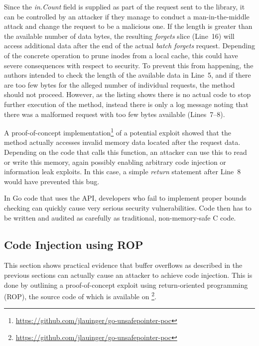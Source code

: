 Since the \textit{in.Count} field is supplied as part of the request sent to the library, it can be controlled by an
attacker if they manage to conduct a man-in-the-middle attack and change the request to be a malicious one.
If the length is greater than the available number of data bytes, the resulting \textit{forgets} slice (Line~16) will
access additional data after the end of the actual \textit{batch forgets} request.
Depending of the concrete operation to prune inodes from a local cache, this could have severe consequences with respect
to security.
To prevent this from happening, the authors intended to check the length of the available data in Line~5, and if there
are too few bytes for the alleged number of individual requests, the method should not proceed.
However, as the listing shows there is no actual code to stop further execution of the method, instead there is only a
log message noting that there was a malformed request with too few bytes available (Lines~7--8).

A proof-of-concept implementation\footnote{\url{https://github.com/jlauinger/go-unsafepointer-poc}} of a potential
exploit showed that the method actually accesses invalid memory data located after the request data.
Depending on the code that calls this function, an attacker can use this to read or write this memory, again possibly
enabling arbitrary code injection or information leak exploits.
In this case, a simple \textit{return} statement after Line~8 would have prevented this bug.

\begin{insight}
    In Go code that uses the \unsafe{} \acrshort{API}, developers who fail to implement proper bounds checking can
    quickly cause very serious security vulnerabilities.
    Code then has to be written and audited as carefully as traditional, non-memory-safe C code.
\end{insight}



\subsection{Code Injection using ROP}\label{subsec:unsafe-security-problems:buffer-overflow:code-flow-redirection}

This section shows practical evidence that buffer overflows as described in the previous sections can actually cause an
attacker to achieve code injection.
This is done by outlining a proof-of-concept exploit using return-oriented programming (\acrshort{ROP}), the source code
of which is available on \github{}\footnote{\url{https://github.com/jlauinger/go-unsafepointer-poc}}.

